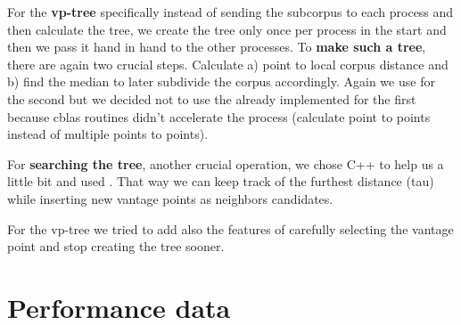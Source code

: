 \documentclass[12pt, a4paper]{article}
\begin{document}
For the \textbf{vp-tree} specifically instead of sending the subcorpus to each process and then calculate the tree, we create the tree only once per process in the start and then we pass it hand in hand to the other processes. To \textbf{make such a tree}, there are again two crucial steps. Calculate a) point to local corpus distance and b) find the median to later subdivide the corpus accordingly. Again we use  for the second but we decided not to use the already implemented  for the first because cblas routines didn't accelerate the process (calculate point to points instead of multiple points to points). 

For \textbf{searching the tree}, another crucial operation, we chose C++ to help us a little bit and used . That way we can keep track of the furthest distance (tau) while inserting new vantage points as neighbors candidates.

For the vp-tree we tried to add also the features of carefully selecting the vantage point and stop creating the tree sooner.


\section{Performance data}
\end{document}
